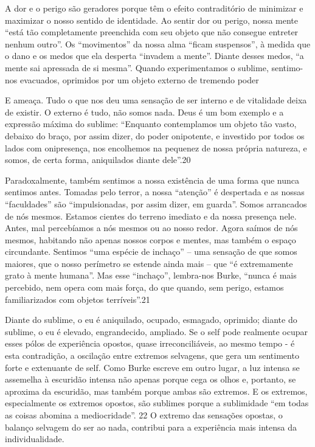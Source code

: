  \par 
A dor e o perigo são geradores porque têm o efeito contraditório de minimizar e maximizar o nosso sentido de identidade. Ao sentir dor ou perigo, nossa mente “está tão completamente preenchida com seu objeto que não consegue entreter nenhum outro”. Os “movimentos” da nossa alma “ficam suspensos”, à medida que o dano e os medos que ela desperta “invadem a mente”. Diante desses medos, “a mente sai apressada de si mesma”. Quando experimentamos o sublime, sentimo-nos evacuados, oprimidos por um objeto externo de tremendo poder
 \par 
E ameaça. Tudo o que nos deu uma sensação de ser interno e de vitalidade deixa de existir. O externo é tudo, não somos nada. Deus é um bom exemplo e a expressão máxima do sublime: “Enquanto contemplamos um objeto tão vasto, debaixo do braço, por assim dizer, do poder onipotente, e investido por todos os lados com onipresença, nos encolhemos na pequenez de nossa própria natureza, e somos, de certa forma, aniquilados diante dele”.{\color{blue}20}
 \par 
Paradoxalmente, também sentimos a nossa existência de uma forma que nunca sentimos antes. Tomadas pelo terror, a nossa “atenção” é despertada e as nossas “faculdades” são “impulsionadas, por assim dizer, em guarda”. Somos arrancados de nós mesmos. Estamos cientes do terreno imediato e da nossa presença nele. Antes, mal percebíamos a nós mesmos ou ao nosso redor. Agora saímos de nós mesmos, habitando não apenas nossos corpos e mentes, mas também o espaço circundante. Sentimos “uma espécie de inchaço” – uma sensação de que somos maiores, que o nosso perímetro se estende ainda mais – que “é extremamente grato à mente humana”. Mas esse “inchaço”, lembra-nos Burke, “nunca é mais percebido, nem opera com mais força, do que quando, sem perigo, estamos familiarizados com objetos terríveis”.{\color{blue}21}
 \par 
Diante do sublime, o eu é aniquilado, ocupado, esmagado, oprimido; diante do sublime, o eu é elevado, engrandecido, ampliado. Se o self pode realmente ocupar esses pólos de experiência opostos, quase irreconciliáveis, ao mesmo tempo - é esta contradição, a oscilação entre extremos selvagens, que gera um sentimento forte e extenuante de self. Como Burke escreve em outro lugar, a luz intensa se assemelha à escuridão intensa não apenas porque cega os olhos e, portanto, se aproxima da escuridão, mas também porque ambas são extremos. E os extremos, especialmente os extremos opostos, são sublimes porque a sublimidade “em todas as coisas abomina a mediocridade”. {\color{blue}22} O extremo das sensações opostas, o balanço selvagem do ser ao nada, contribui para a experiência mais intensa da individualidade.
